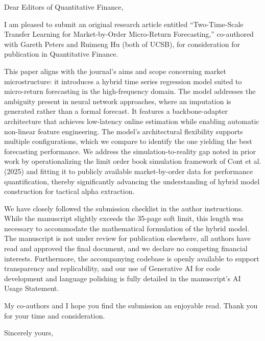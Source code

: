\documentclass[ucsb,pstat, 12pt,letterpaper]{ucletter}
\begin{document}
\begin{letter}{}
	
\date{\today}

\signature{Juan Diego Mej\'{i}a Becerra\\\mbox{PhD (Cand.), Department of Statistics and Applied Probability}  \\\mbox{University of California, Santa Barbara} \\
	Email: jmejiabecerra@ucsb.edu}


\opening{\vspace{0pt}Dear Editors of Quantitative Finance,}

\medskip

\vspace{0pt}

I am pleased to submit an original research article entitled ``Two-Time-Scale Transfer Learning for Market-by-Order Micro-Return Forecasting,'' co-authored with Gareth Peters and Ruimeng Hu (both of UCSB), for consideration for publication in Quantitative Finance.

\medskip

This paper aligns with the journal's aims and scope concerning market microstructure: it introduces a hybrid time series regression model suited to micro-return forecasting in the high-frequency domain. The model addresses the ambiguity present in neural network approaches, where an imputation is generated rather than a formal forecast. It features a backbone-adapter architecture that achieves low-latency online estimation while enabling automatic non-linear feature engineering. The model's architectural flexibility supports multiple configurations, which we compare to identify the one yielding the best forecasting performance. We address the simulation-to-reality gap noted in prior work by operationalizing the limit order book simulation framework of Cont et al. (2025) and fitting it to publicly available market-by-order data for performance quantification, thereby significantly advancing the understanding of hybrid model construction for tactical alpha extraction.

\medskip

We have closely followed the submission checklist in the author instructions. While the manuscript slightly exceeds the 35-page soft limit, this length was necessary to accommodate the mathematical formulation of the hybrid model. The manuscript is not under review for publication elsewhere, all authors have read and approved the final document, and we declare no competing financial interests. Furthermore, the accompanying codebase is openly available to support transparency and replicability, and our use of Generative AI for code development and language polishing is fully detailed in the manuscript's AI Usage Statement.

\medskip
My co-authors and I hope you find the submission an enjoyable read. Thank you for your time and consideration.


\closing{Sincerely yours,}
\end{letter}
\end{document}
